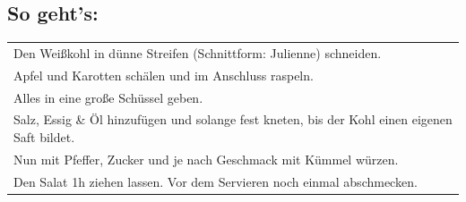 \subsection*{So geht's:}
\begin{tabular}{p{15cm}}
	\\
	Den Weißkohl in dünne Streifen (Schnittform: Julienne) schneiden.\\
	Apfel und Karotten schälen und im Anschluss raspeln.\\
  Alles in eine große Schüssel geben.\\
	Salz, Essig \& Öl hinzufügen und solange fest kneten, bis der Kohl einen eigenen Saft bildet.\\
	Nun mit Pfeffer, Zucker und je nach Geschmack mit Kümmel würzen.\\
	Den Salat 1h ziehen lassen. Vor dem Servieren noch einmal abschmecken.
\end{tabular}

